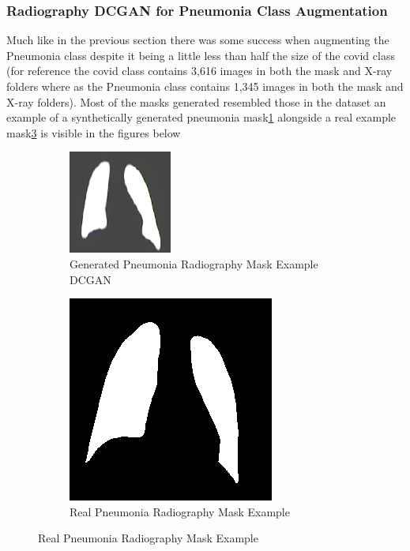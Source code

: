 \subsubsection{Radiography DCGAN for Pneumonia Class Augmentation}
Much like in the previous section there was some success when augmenting the Pneumonia class despite it being a little less than half the size of the covid class (for reference the covid class contains 3,616 images in both the mask and X-ray folders where as the Pneumonia class contains 1,345 images in both the mask and X-ray folders).  Most of the masks generated resembled those in the dataset an example of a synthetically generated pneumonia mask\ref{fig:Synthetically Generated Pneumonia Radiography Mask(DCGAN)} alongside a real example mask\ref{fig:Real Pneumonia Radiography Mask Example} is visible in the figures below
 \begin{figure}[H]
    \centering
    \begin{subfigure}{.4\textwidth}
    \centering
      \includegraphics[width=.4\linewidth,keepaspectratio]{Images/ExampleOfSyntheticallyGeneratedMaskPneumoniaCOVID19RadiographyDCGAN.png}
      \caption{Generated Pneumonia Radiography Mask Example DCGAN}
      \label{fig:Synthetically Generated Pneumonia Radiography Mask(DCGAN)}
    \end{subfigure}\hfill%
    \begin{subfigure}{.4\textwidth}
    \centering
      \includegraphics[width=.4\linewidth,keepaspectratio]{Images/ExampleOfPneumoniaMaskRadiographyCOVID19.png}
      \caption{Real Pneumonia Radiography Mask Example}
      \label{fig:Real Pneumonia Radiography Mask Example}
    \end{subfigure}\hfill%
\end{figure}
